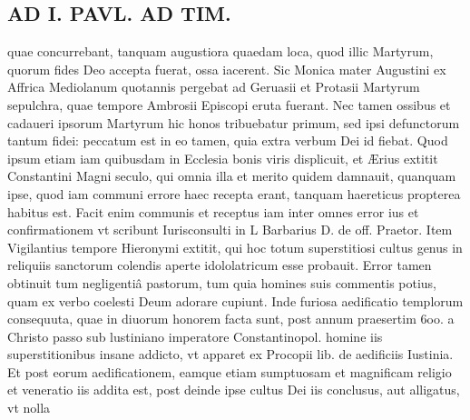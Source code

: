 \documentclass{article}
\begin{document}
\begin{pages}
\section*{AD I. PAVL. AD TIM. }
\marginpar{[ p.70 ]}\pstart quae concurrebant, tanquam augustiora quaedam loca, quod illic Martyrum, quorum fides Deo accepta fuerat, ossa iacerent. Sic Monica mater Augustini ex Affrica Mediolanum quotannis pergebat ad Geruasii et Protasii Martyrum sepulchra, quae tempore Ambrosii Episcopi eruta fuerant. Nec tamen ossibus et cadaueri ipsorum Martyrum hic honos tribuebatur primum, sed ipsi defunctorum tantum fidei: peccatum est in eo tamen, quia extra verbum Dei id fiebat. Quod ipsum etiam iam quibusdam in Ecclesia bonis viris displicuit, et Ærius extitit Constantini Magni seculo, qui omnia illa et merito quidem damnauit, quanquam ipse, quod iam communi errore haec recepta erant, tanquam haereticus propterea habitus est. Facit enim communis et receptus iam inter omnes error ius et confirmationem vt scribunt Iurisconsulti in L Barbarius D. de off. Praetor. Item Vigilantius tempore Hieronymi extitit, qui hoc totum superstitiosi cultus genus in reliquiis sanctorum colendis aperte idololatricum esse probauit. Error tamen obtinuit tum negligentiâ pastorum, tum quia homines suis commentis potius, quam ex verbo coelesti Deum adorare cupiunt. Inde furiosa aedificatio templorum consequuta, quae in diuorum honorem facta sunt, post annum praesertim 6oo. a Christo passo sub lustiniano imperatore Constantinopol. homine iis superstitionibus insane addicto, vt apparet ex Procopii lib.  de aedificiis Iustinia. Et post eorum aedificationem, eamque etiam sumptuosam et magnificam religio et veneratio iis addita est, post deinde ipse cultus Dei iis conclusus, aut alligatus, vt nolla  \pend

\end{pages}
\end{document}
